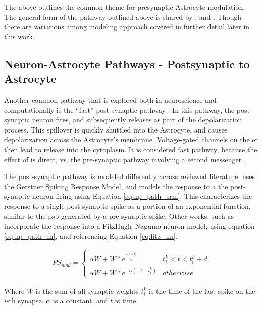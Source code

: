     The above outlines the common theme for presynaptic Astrocyte
    modulation. The general form of the pathway outlined above is shared by
    \parencite{postnov_2009}, and \parencite{wade_2011}. Though there are
    variations among modeling approach covered in further detail later in this
    work.

    \subsection{Neuron-Astrocyte Pathways - Postsynaptic to Astrocyte}
    Another common pathway that is explored both in neuroscience and
    computationally is the ``fast'' post-synaptic pathway \parencite{bassam_2015}. In
    this pathway, the post-synaptic neuron fires, and subsequently releases \kp
    as part of the depolarization process. This \kp spillover is quickly shuttled
    into the Astrocyte, and causes depolarization across the Astrocyte's
    membrane. Voltage-gated channels on the \Gls{er} then lead to \ca release into
    the cytoplasm. It is considered fast pathway, because the effect of \kp is
    direct, vs. the pre-synaptic pathway involving a second messenger
    \parencite{bassam_2015}.

    The post-synaptic pathway is modeled differently across reviewed
    literature. \parencite{bassam_2015} uses the Gerstner Spiking Response
    Model, and models the \ca response to a the post-synaptic neuron firing
    using Equation \ref{eq:kp_path_srm}. This characterizes the response to a
    single post-synaptic spike as a portion of an exponential function, similar
    to the \Gls{psp} generated by a pre-synaptic spike. Other works, such as
    \parencite{postnov_2007} incorporate the \ca response into a FitzHugh–Nagumo
    neuron model, using equation \ref{eq:kp_path_fn}, and referencing Equation
    \ref{eq:fitz_nn}.

    \begin{align}
        PS_{mod} =
        \begin{cases}
          \alpha W + W * e^{\frac{-t - t^k_{i}}{\tau_s}} & t^k_{i} < t < t^k_{i}
          + d \\
          \alpha W + W * e^{-\alpha (-t - t^k_{i})} & otherwise
       \end{cases} \label{eq:kp_path_srm}      
    \end{align}

    Where $W$ is the sum of all synaptic weights $t^k_i$ is the time of the last
    spike on the $i$-th synapse. $\alpha$ is a constant, and $t$ is time.

